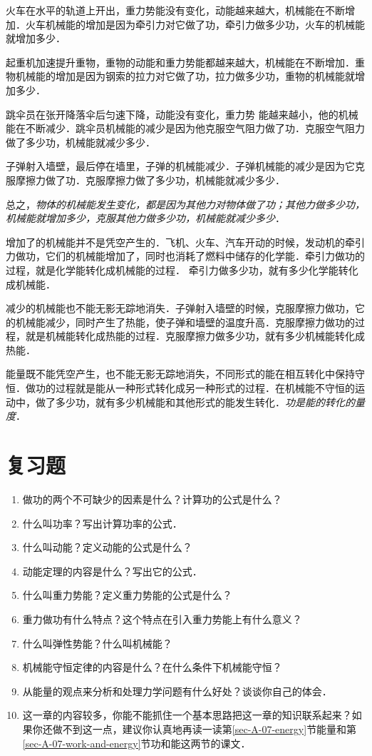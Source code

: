 火车在水平的轨道上开出，重力势能没有变化，动能越来越大，机械能在不断增加．火车机械能的增加是因为牵引力对它做了功，牵引力做多少功，火车的机械能就增加多少．

起重机加速提升重物，重物的动能和重力势能都越来越大，机械能在不断增加．重物机械能的增加是因为钢索的拉力对它做了功，拉力做多少功，重物的机械能就增加多少．

跳伞员在张开降落伞后匀速下降，动能没有变化，重力势
能越来越小，他的机械能在不断减少．跳伞员机械能的减少是因为他克服空气阻力做了功．克服空气阻力做了多少功，机械能就减少多少．

子弹射入墙壁，最后停在墙里，子弹的机械能减少．子弹机械能的减少是因为它克服摩擦力做了功．克服摩擦力做了多少功，机械能就减少多少．

总之，\textit{物体的机械能发生变化，都是因为其他力对物体做了功；其他力做多少功，机械能就增加多少，克服其他力做多少功，机械能就减少多少}．

增加了的机械能并不是凭空产生的．飞机、火车、汽车开动的时候，发动机的牵引力做功，它们的机械能增加了，同时也消耗了燃料中储存的化学能．牵引力做功的过程，就是化学能转化成机械能的过程．
牵引力做多少功，就有多少化学能转化成机械能．

减少的机械能也不能无影无踪地消失．子弹射入墙壁的时候，克服摩擦力做功，它的机械能减少，同时产生了热能，使子弹和墙壁的温度升高．克服摩擦力做功的过程，就是机械能转化成热能的过程．克服摩擦力做多少功，就有多少机械能转化成热能．

能量既不能凭空产生，也不能无影无踪地消失，不同形式的能在相互转化中保持守恒．做功的过程就是能从一种形式转化成另一种形式的过程．在机械能不守恒的运动中，做了多少功，就有多少机械能和其他形式的能发生转化．\textit{功是能的转化的量度}．

\section*{复习题}
\begin{enumerate}
    \item 做功的两个不可缺少的因素是什么？计算功的公式是什么？
    \item 什么叫功率？写出计算功率的公式．
    \item 什么叫动能？定义动能的公式是什么？
    \item 动能定理的内容是什么？写出它的公式．
    \item 什么叫重力势能？定义重力势能的公式是什么？
    \item 重力做功有什么特点？这个特点在引入重力势能上有什么意义？
    \item 什么叫弹性势能？什么叫机械能？
    \item 机械能守恒定律的内容是什么？在什么条件下机械能守恒？
    \item 从能量的观点来分析和处理力学问题有什么好处？谈谈你自己的体会．
    \item 这一章的内容较多，你能不能抓住一个基本思路把这一章的知识联系起来？如果你还做不到这一点，建议你认真地再读一读第\ref{sec-A-07-energy}节能量和第\ref{sec-A-07-work-and-energy}节功和能这两节的课文．
\end{enumerate}

